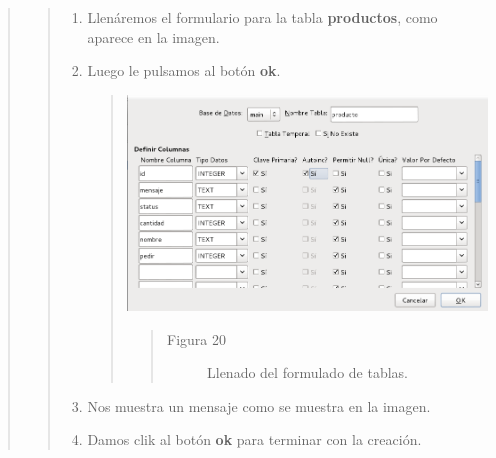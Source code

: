 \documentclass[letterpaper,11pt,spanish]{sphinxmanual}
\begin{document}
\begin{quote}
\begin{quote}
\begin{enumerate}
\begin{quote}
\begin{quote}
\begin{description}
\end{description}\end{quote}
\end{quote}

\item {} 
Llenáremos el formulario para la tabla \textbf{productos}, como aparece en la imagen.

\item {} 
Luego le pulsamos al botón \textbf{ok}.
\begin{quote}

\includegraphics{tabla2.png}
\begin{quote}\begin{description}
\item[{Figura 20}] \leavevmode
Llenado del formulado de tablas.

\end{description}\end{quote}
\end{quote}

\item {} 
Nos muestra un mensaje como se muestra en la imagen.

\item {} 
Damos clik al botón \textbf{ok} para terminar con la creación.
\begin{quote}


\end{quote}
\end{enumerate}
\end{quote}
\end{quote}
\end{document}
